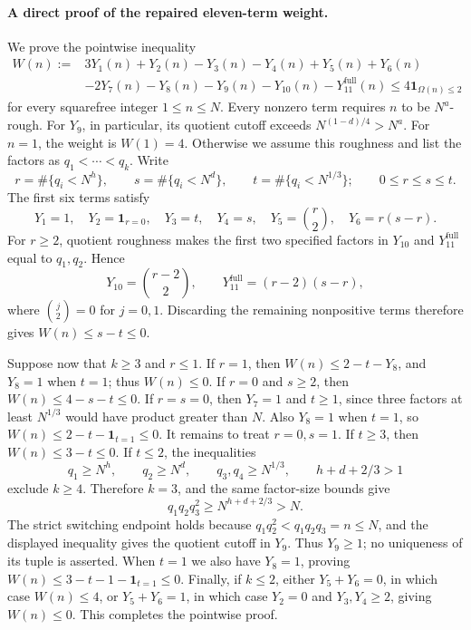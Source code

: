 \documentclass[11pt]{article}
\begin{document}
\paragraph{A direct proof of the repaired eleven-term weight.}
We prove the pointwise inequality
\begin{align*}
 W(n):={}&3Y_1(n)+Y_2(n)-Y_3(n)-Y_4(n)+Y_5(n)+Y_6(n)\\
         &-2Y_7(n)-Y_8(n)-Y_9(n)-Y_{10}(n)
           -Y_{11}^{\mathrm{full}}(n)
       \le4\mathbf1_{\Omega(n)\le2}
\end{align*}
for every squarefree integer $1\le n\le N$.
Every nonzero term requires $n$ to be $N^a$-rough. For $Y_9$, in
particular, its quotient cutoff exceeds $N^{(1-d)/4}>N^a$.
For $n=1$, the weight is $W(1)=4$. Otherwise we assume this roughness
and list the factors as
$q_1<\cdots<q_k$. Write
\[
 r=\#\{q_i<N^h\},\qquad s=\#\{q_i<N^d\},\qquad
 t=\#\{q_i<N^{1/3}\};\qquad 0\le r\le s\le t.
\]
The first six terms satisfy
\[
 Y_1=1,\quad Y_2=\mathbf1_{r=0},\quad Y_3=t,\quad Y_4=s,
 \quad Y_5=\binom r2,\quad Y_6=r(s-r).
\]
For $r\ge2$, quotient roughness makes the first two specified factors
in $Y_{10}$ and $Y_{11}^{\mathrm{full}}$ equal to $q_1,q_2$. Hence
\[
 Y_{10}=\binom{r-2}{2},\qquad
 Y_{11}^{\mathrm{full}}=(r-2)(s-r),
\]
where $\binom j2=0$ for $j=0,1$. Discarding the remaining nonpositive
terms therefore gives $W(n)\le s-t\le0$.

Suppose now that $k\ge3$ and $r\le1$.
If $r=1$, then $W(n)\le2-t-Y_8$, and $Y_8=1$ when $t=1$;
thus $W(n)\le0$.
If $r=0$ and $s\ge2$, then $W(n)\le4-s-t\le0$.
If $r=s=0$, then $Y_7=1$ and $t\ge1$, since three factors at least
$N^{1/3}$ would have product greater than $N$. Also $Y_8=1$ when
$t=1$, so $W(n)\le2-t-\mathbf1_{t=1}\le0$.
It remains to treat $r=0,s=1$. If $t\ge3$, then
$W(n)\le3-t\le0$. If $t\le2$, the inequalities
\[
 q_1\ge N^h,\qquad q_2\ge N^d,\qquad
 q_3,q_4\ge N^{1/3},\qquad h+d+2/3>1
\]
exclude $k\ge4$. Therefore $k=3$, and the same factor-size bounds give
\[
 q_1q_2q_3^2\ge N^{h+d+2/3}>N.
\]
The strict switching endpoint holds because
$q_1q_2^2<q_1q_2q_3=n\le N$, and the displayed inequality gives
the quotient cutoff in $Y_9$. Thus $Y_9\ge1$; no uniqueness of its
tuple is asserted. When $t=1$ we also have $Y_8=1$, proving
$W(n)\le3-t-1-\mathbf1_{t=1}\le0$.
Finally, if $k\le2$, either $Y_5+Y_6=0$, in which case $W(n)\le4$,
or $Y_5+Y_6=1$, in which case $Y_2=0$ and $Y_3,Y_4\ge2$, giving
$W(n)\le0$. This completes the pointwise proof.
\end{document}

